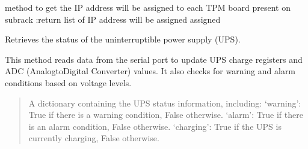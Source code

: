 \documentclass[letterpaper,10pt,english]{sphinxmanual}
\begin{document}
\begin{fulllineitems}
\begin{fulllineitems}
\end{fulllineitems}


\begin{fulllineitems}
\label{\detokenize{apidocs:subrack_management_board.SubrackMngBoard.GetTPM_Add_List}}
\pysigstartsignatures
{}
\pysigstopsignatures
\sphinxAtStartPar
method to get the IP address will be assigned to each TPM board present on subrack
:return list of IP address will be assigned assigned

\end{fulllineitems}


\begin{fulllineitems}
\label{\detokenize{apidocs:subrack_management_board.SubrackMngBoard.GetUPSStatus}}
\pysigstartsignatures
{}
\pysigstopsignatures
\sphinxAtStartPar
Retrieves the status of the uninterruptible power supply (UPS).

\sphinxAtStartPar
This method reads data from the serial port to update UPS charge registers and
ADC (Analog\sphinxhyphen{}to\sphinxhyphen{}Digital Converter) values. It also checks for warning and alarm
conditions based on voltage levels.
\begin{quote}\begin{description}
\sphinxAtStartPar
A dictionary containing the UPS status information, including:
\sphinxhyphen{} ‘warning’: True if there is a warning condition, False otherwise.
\sphinxhyphen{} ‘alarm’: True if there is an alarm condition, False otherwise.
\sphinxhyphen{} ‘charging’: True if the UPS is currently charging, False otherwise.

\end{description}\end{quote}

\end{fulllineitems}



\end{fulllineitems}
\end{document}
